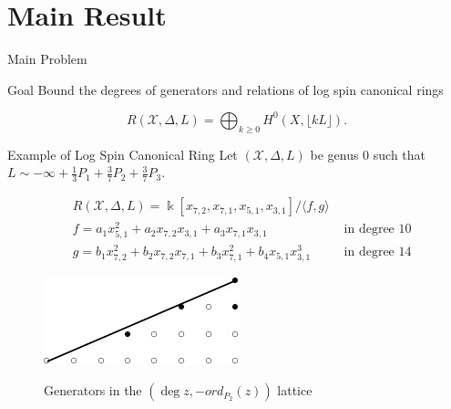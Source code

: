 \documentclass{beamer}
\theoremstyle{remark}
\newcommand \sx{{\mathscr X}}
\newcommand{\halfcan}{L}
\newcommand\Bk{{\Bbbk}}
\begin{document}
\section{Main Result}

\begin{frame}{Main Problem}

\begin{block}{Goal}
Bound the degrees of generators and relations of log spin
canonical rings

\[
	R(\sx, \Delta, \halfcan) = \bigoplus_{k \geq 0} H^0(X, \lfloor k \halfcan \rfloor).
\]
\end{block}
\end{frame}

\begin{frame}{Example of Log Spin Canonical Ring}
Let $(\sx, \Delta, \halfcan)$ be genus 0 such that $\halfcan \sim -\infty + \frac{1}{3} P_1 +
\frac{3}{7} P_2 + \frac{3}{7} P_3$. 

\vspace*{-0.5cm}
\begin{align*}
	&R(\sx, \Delta, \halfcan) = \Bk[x_{7, 2}, x_{7, 1}, x_{5, 1}, x_{3, 1}] / \langle f, g \rangle \\
	&f = a_1 x_{5, 1}^2 + a_2 x_{7, 2} x_{3, 1} + a_3 x_{7, 1} x_{3, 1} 
	&\text{ in degree $10$} \\
	&g = b_1 x_{7, 2}^2 + b_2 x_{7, 2} x_{7, 1} + b_3 x_{7, 1}^2
	+ b_4 x_{5, 1} x_{3, 1}^3  &\text{ in degree $14$}
\end{align*}

\begin{figure}
\includegraphics{pics/spin-377-pic-pics.pdf} \\
\caption{Generators in the $(\deg z, -ord_{P_2}(z))$ lattice}
\end{figure}

\end{frame}
\end{document}
